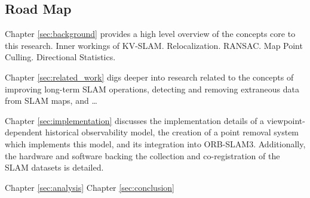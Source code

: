 \subsection{Road Map}

Chapter \ref{sec:background} provides a high level overview of the concepts core to this research. Inner workings of KV-SLAM. Relocalization. RANSAC. Map Point Culling. Directional Statistics.

Chapter \ref{sec:related_work} digs deeper into research related to the concepts of improving long-term SLAM operations, detecting and removing extraneous data from SLAM maps, and \dots

Chapter \ref{sec:implementation} discusses the implementation details of a viewpoint-dependent historical observability model, the creation of a point removal system which implements this model, and its integration into ORB-SLAM3. Additionally, the hardware and software backing the collection and co-registration of the SLAM datasets is detailed.

Chapter \ref{sec:analysis} 
Chapter \ref{sec:conclusion}